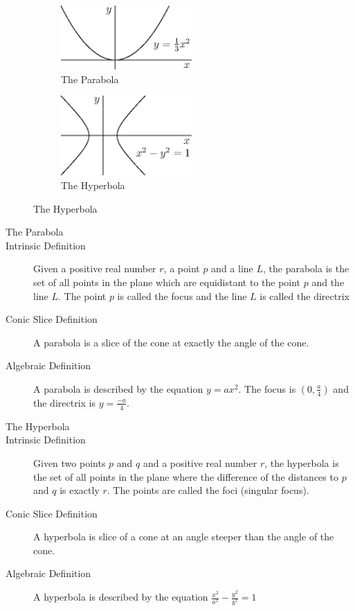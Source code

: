 \documentclass[fleqn]{report}
\begin{document}
\begin{figure}[b]
\centering
\begin{subfigure}{.5\textwidth}
 \centering
 \includegraphics[width=5cm]{figure05.eps}
 \caption{The Parabola}
\end{subfigure}%
\begin{subfigure}{.5\textwidth}
 \centering
 \includegraphics[width=5cm]{figure04.eps}
 \caption{The Hyperbola}
\end{subfigure}
\label{Conics 2}
\end{figure}
\clearpage

\begin{description}
\item[The Parabola]
\item[Intrinsic Definition] Given a positive real number $r$,
a point $p$ and a line $L$, the parabola is the set of all
points in the plane which are equidistant to the point $p$
and the line $L$. The point $p$ is called the focus and the
line $L$ is called the directrix
\item[Conic Slice Definition] A parabola is a slice of the cone
at exactly the angle of the cone.
\item[Algebraic Definition] A parabola is described by the
equation $y = ax^2$. The focus is $(0,\frac{a}{4})$ and the
directrix is $y=\frac{-a}{4}$. 
\end{description}

\begin{description}
\item[The Hyperbola]
\item[Intrinsic Definition] Given two points $p$ and $q$ and a
positive real number $r$, the hyperbola is the set of all points
in the plane where the difference of the distances to $p$ and $q$ is
exactly $r$. The points are called the foci (singular focus). 
\item[Conic Slice Definition] A hyperbola is slice of a cone at
an angle steeper than the angle of the cone.
\item[Algebraic Definition] A hyperbola is described by the
equation $\frac{x^2}{a^2} - \frac{y^2}{b^2} = 1$
\end{description}
\end{document}
